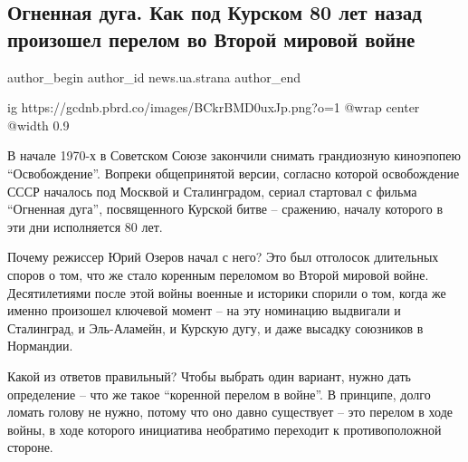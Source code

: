  
 
 
 
 
 
\subsection{Огненная дуга. Как под Курском 80 лет назад произошел перелом во Второй мировой войне}
\label{sec:02_07_2023.stz.news.ua.strana.2.kurskaja_duga}
 
\ifcmt
 author_begin
   author_id news.ua.strana
 author_end
\fi

\ifcmt
  ig https://gcdnb.pbrd.co/images/BCkrBMD0uxJp.png?o=1
  @wrap center
  @width 0.9
\fi

В начале 1970-х в Советском Союзе закончили снимать грандиозную киноэпопею
\enquote{Освобождение}. Вопреки общепринятой версии, согласно которой освобождение СССР
началось под Москвой и Сталинградом, сериал стартовал с фильма \enquote{Огненная дуга},
посвященного Курской битве – сражению, началу которого в эти дни исполняется 80
лет.

Почему режиссер Юрий Озеров начал с него? Это был отголосок длительных споров о
том, что же стало коренным переломом во Второй мировой войне. Десятилетиями
после этой войны военные и историки спорили о том, когда же именно произошел
ключевой момент – на эту номинацию выдвигали и Сталинград, и Эль-Аламейн, и
Курскую дугу, и даже высадку союзников в Нормандии.


Какой из ответов правильный? Чтобы выбрать один вариант, нужно дать определение
– что же такое \enquote{коренной перелом в войне}. В принципе, долго ломать голову не
нужно, потому что оно давно существует – это перелом в ходе войны, в ходе
которого инициатива необратимо переходит к противоположной стороне.

